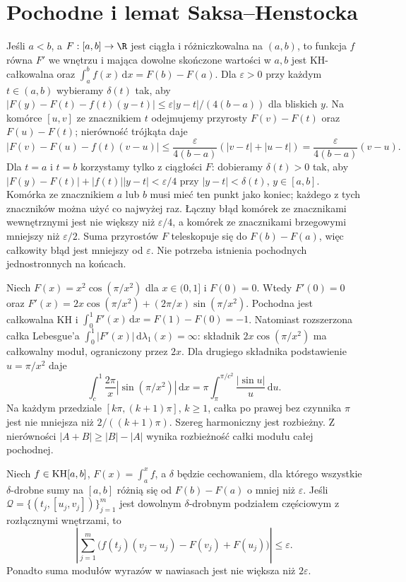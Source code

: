 \section{Pochodne i lemat Saksa--Henstocka}
\begin{przyklad}\label{ma1:kh:ex:all-derivatives}
Jeśli $a<b$, a $F:[a,b]\to\R$ jest ciągła i różniczkowalna na $(a,b)$, to funkcja $f$ równa $F'$ we wnętrzu i mająca dowolne skończone wartości w $a,b$ jest KH-całkowalna oraz $\int_a^b f(x)\,\mathrm dx=F(b)-F(a)$. Dla $\varepsilon>0$ przy każdym $t\in(a,b)$ wybieramy $\delta(t)$ tak, aby $|F(y)-F(t)-f(t)(y-t)|\le\varepsilon|y-t|/(4(b-a))$ dla bliskich $y$. Na komórce $[u,v]$ ze znacznikiem $t$ odejmujemy przyrosty $F(v)-F(t)$ oraz $F(u)-F(t)$; nierówność trójkąta daje
\[
 |F(v)-F(u)-f(t)(v-u)|
 \le \frac{\varepsilon}{4(b-a)}(|v-t|+|u-t|)
 =\frac{\varepsilon}{4(b-a)}(v-u).
\]
Dla $t=a$ i $t=b$ korzystamy tylko z ciągłości $F$: dobieramy $\delta(t)>0$ tak, aby $|F(y)-F(t)|+|f(t)||y-t|<\varepsilon/4$ przy $|y-t|<\delta(t)$, $y\in[a,b]$. Komórka ze znacznikiem $a$ lub $b$ musi mieć ten punkt jako koniec; każdego z tych znaczników można użyć co najwyżej raz. Łączny błąd komórek ze znacznikami wewnętrznymi jest nie większy niż $\varepsilon/4$, a komórek ze znacznikami brzegowymi mniejszy niż $\varepsilon/2$. Suma przyrostów $F$ teleskopuje się do $F(b)-F(a)$, więc całkowity błąd jest mniejszy od $\varepsilon$. Nie potrzeba istnienia pochodnych jednostronnych na końcach.
\end{przyklad}
\begin{przyklad}\label{ma1:kh:ex:conditional-derivative}
Niech $F(x)=x^2\cos(\pi/x^2)$ dla $x\in(0,1]$ i $F(0)=0$. Wtedy $F'(0)=0$ oraz $F'(x)=2x\cos(\pi/x^2)+(2\pi/x)\sin(\pi/x^2)$. Pochodna jest całkowalna KH i $\int_0^1F'(x)\,\mathrm dx=F(1)-F(0)=-1$. Natomiast rozszerzona całka Lebesgue'a $\int_0^1|F'(x)|\,\mathrm d\lambda_1(x)=\infty$:  składnik $2x\cos(\pi/x^2)$ ma całkowalny moduł, ograniczony przez $2x$. Dla drugiego składnika podstawienie $u=\pi/x^2$ daje
\[
 \int_c^1\frac{2\pi}{x}|\sin(\pi/x^2)|\,\mathrm dx
 =\pi\int_\pi^{\pi/c^2}\frac{|\sin u|}{u}\,\mathrm du.
\]
Na każdym przedziale $[k\pi,(k+1)\pi]$, $k\ge1$, całka po prawej bez czynnika $\pi$ jest nie mniejsza niż $2/((k+1)\pi)$. Szereg harmoniczny jest rozbieżny. Z nierówności $|A+B|\ge|B|-|A|$ wynika rozbieżność całki modułu całej pochodnej.
\end{przyklad}
\begin{lemat}\label{ma1:kh:lem:kh-saks-henstock}\label{it:lem:kh-saks-henstock}\label{lem:hk-uzupelnianie}\label{ma1:kh:lem:hk-uzupelnianie}
Niech $f\in\mathrm{KH}[a,b]$, $F(x)=\int_a^x f$, a $\delta$ będzie cechowaniem, dla którego wszystkie $\delta$-drobne sumy na $[a,b]$ różnią się od $F(b)-F(a)$ o mniej niż $\varepsilon$. Jeśli $\mathcal Q=\{(t_j,[u_j,v_j])\}_{j=1}^m$ jest dowolnym $\delta$-drobnym podziałem częściowym z rozłącznymi wnętrzami, to
\[
\left|\sum_{j=1}^m\bigl(f(t_j)(v_j-u_j)-F(v_j)+F(u_j)\bigr)\right|\le\varepsilon.
\]
Ponadto suma modułów wyrazów w nawiasach jest nie większa niż $2\varepsilon$.
\end{lemat}
